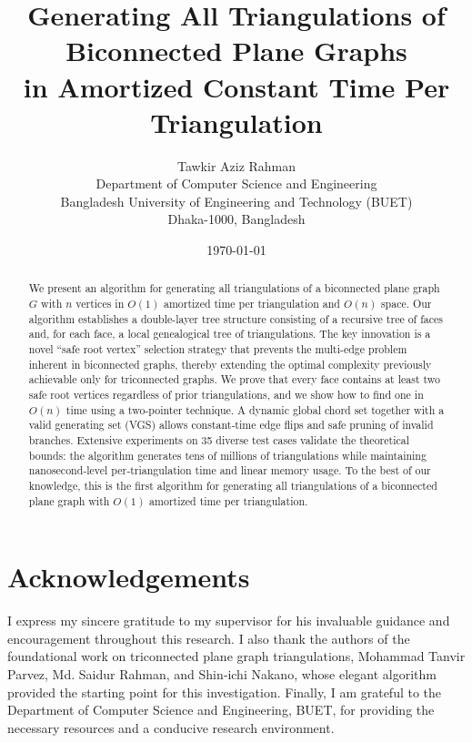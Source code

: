 \documentclass[12pt, a4paper, twoside]{report}
\title{Generating All Triangulations of Biconnected Plane Graphs\\in Amortized Constant Time Per Triangulation}
\author{Tawkir Aziz Rahman\\
Department of Computer Science and Engineering\\
Bangladesh University of Engineering and Technology (BUET)\\
Dhaka-1000, Bangladesh}
\date{\today}
\theoremstyle{definition}
\theoremstyle{remark}
\begin{document}
\maketitle

\begin{abstract}
We present an algorithm for generating all triangulations of a biconnected plane graph $G$ with $n$ vertices in $O(1)$ amortized time per triangulation and $O(n)$ space. 
Our algorithm establishes a double-layer tree structure consisting of a recursive tree of faces and, for each face, a local genealogical tree of triangulations. 
The key innovation is a novel ``safe root vertex'' selection strategy that prevents the multi-edge problem inherent in biconnected graphs, thereby extending the optimal complexity previously achievable only for triconnected graphs. 
We prove that every face contains at least two safe root vertices regardless of prior triangulations, and we show how to find one in $O(n)$ time using a two‑pointer technique. 
A dynamic global chord set together with a valid generating set (VGS) allows constant‑time edge flips and safe pruning of invalid branches. 
Extensive experiments on 35 diverse test cases validate the theoretical bounds: the algorithm generates tens of millions of triangulations while maintaining nanosecond‑level per‑triangulation time and linear memory usage.
To the best of our knowledge, this is the first algorithm for generating all triangulations of a biconnected plane graph with $O(1)$ amortized time per triangulation.
\end{abstract}

\chapter*{Acknowledgements}
\begin{flushleft}
I express my sincere gratitude to my supervisor for his invaluable guidance and encouragement throughout this research. 
I also thank the authors of the foundational work on triconnected plane graph triangulations, Mohammad Tanvir Parvez, Md. Saidur Rahman, and Shin‑ichi Nakano, whose elegant algorithm provided the starting point for this investigation. 
Finally, I am grateful to the Department of Computer Science and Engineering, BUET, for providing the necessary resources and a conducive research environment.
\end{flushleft}

\tableofcontents
\listoffigures
\listofalgorithms
\end{document}
